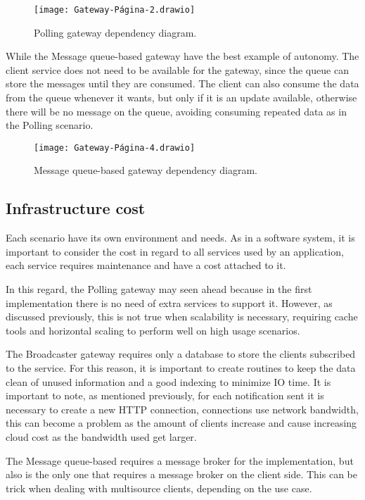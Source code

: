 \begin{figure}
    \centering
    \texttt{[image: Gateway-Página-2.drawio]}
    \caption{Polling gateway dependency diagram.\label{fig:subfigures7}}
\end{figure}

While the Message queue-based gateway have the best example of autonomy. The client service does not need to be available for the gateway, since the queue can store the messages until they are consumed. The client can also consume the data from the queue whenever it wants, but only if it is an update available, otherwise there will be no message on the queue, avoiding consuming repeated data as in the Polling scenario.

\begin{figure}
    \centering
    \texttt{[image: Gateway-Página-4.drawio]}
    \caption{Message queue-based gateway dependency diagram.\label{fig:subfigures8}}
\end{figure}

\subsection*{Infrastructure cost}
\label{sec:infra}

Each scenario have its own environment and needs. As in a software system, it is important to consider the cost in regard to all services used by an application, each service requires maintenance and have a cost attached to it.

In this regard, the Polling gateway may seen ahead because in the first implementation there is no need of extra services to support it. However, as discussed previously, this is not true when scalability is necessary, requiring cache tools and horizontal scaling to perform well on high usage scenarios.

The Broadcaster gateway requires only a database to store the clients subscribed to the service. For this reason, it is important to create routines to keep the data clean of unused information and a good indexing to minimize IO time. It is important to note, as mentioned previously, for each notification sent it is necessary to create a new HTTP connection, connections use network bandwidth, this can become a problem as the amount of clients increase and cause increasing cloud cost as the bandwidth used get larger.

The Message queue-based requires a message broker for the implementation, but also is the only one that requires a message broker on the client side. This can be trick when dealing with multisource clients, depending on the use case.
